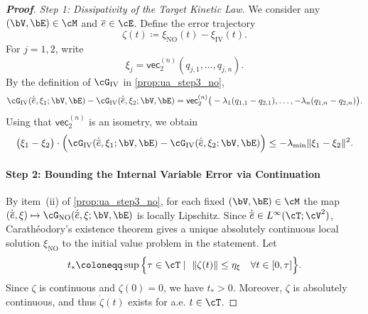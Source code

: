 \begin{proof}[\bf Proof]
\textit{Step 1: Dissipativity of the Target Kinetic Law.}
We consider any $(\bV,\bE)\in\cM$ and $\overline e\in\cE$. Define the error trajectory
\begin{equation*}
\zeta(t)\coloneqq \xi_{\mathrm{NO}}(t)-\xi_{\mathrm{IV}}(t).
\end{equation*}
For $j=1,2$, write
\begin{equation*}
\xi_j=\mathsf{vec}_2^{(n)}(q_{j,1},\dots,q_{j,n}).
\end{equation*}
By the definition of $\cG_{\mathrm{IV}}$ in \cref{prop:ua_step3_no},
\begin{equation*}
\cG_{\mathrm{IV}}(\dot{\overline e},\xi_1;\bV,\bE)-\cG_{\mathrm{IV}}(\dot{\overline e},\xi_2;\bV,\bE)
=\mathsf{vec}_2^{(n)}\big(-\lambda_1(q_{1,1}-q_{2,1}),\dots,-\lambda_n(q_{1,n}-q_{2,n})\big).
\end{equation*}
Using that $\mathsf{vec}_2^{(n)}$ is an isometry, we obtain
\begin{equation*}
\big(\xi_1-\xi_2\big)\cdot\Big(\cG_{\mathrm{IV}}(\dot{\overline e},\xi_1;\bV,\bE)-\cG_{\mathrm{IV}}(\dot{\overline e},\xi_2;\bV,\bE)\Big)
\le -\lambda_{\min}\|\xi_1-\xi_2\|^2.
\end{equation*}

\paragraph{Step 2: Bounding the Internal Variable Error via Continuation}
By item~(ii) of \cref{prop:ua_step3_no}, for each fixed $(\bV,\bE)\in\cM$ the map $(\dot{\overline e},\xi)\mapsto \cG_{\mathrm{NO}}(\dot{\overline e},\xi;\bV,\bE)$ is locally Lipschitz. Since $\dot{\overline{e}} \in L^\infty(\cT; \cV^{2})$, Carath\'eodory's existence theorem gives a unique absolutely continuous local solution $\xi_{\mathrm{NO}}$ to the initial value problem in the statement. Let
\begin{equation*}
t_* \coloneqq \sup\Big\{\tau\in\cT\mid\ \|\zeta(t)\|\leq \eta_{\xi}\quad \forall t\in[0,\tau]\Big\}.
\end{equation*}
Since $\zeta$ is continuous and $\zeta(0)=0$, we have $t_*>0$.
Moreover, $\zeta$ is absolutely continuous, and thus $\dot\zeta(t)$ exists for a.e. $t\in\cT$.


\end{proof}
